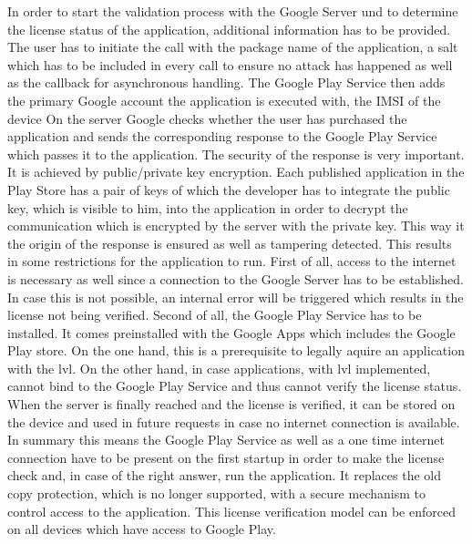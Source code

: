 In order to start the validation process with the Google Server und to determine the license status of the application, additional information has to be provided.
The user has to initiate the call with  the package name of the application, a salt which has to be included in every call to ensure no attack has happened as well as the callback for asynchronous handling.
The Google Play Service then adds the primary Google account the application is executed with, the IMSI of the device
On the server Google checks whether the user has purchased the application and sends the corresponding response to the Google Play Service which passes it to the application. \cite{developersLicensingOverview}
\newline
The security of the response is very important.
It is achieved by public/private key encryption.
Each published application in the Play Store has a pair of keys of which the developer has to integrate the public key, which is visible to him, into the application in order to decrypt the communication which is encrypted by the server with the private key.
This way it the origin of the response is ensured as well as tampering detected.
\cite{munteanLicense}\cite{developersLicensingOverview}
\newline
This results in some restrictions for the application to run.
First of all, access to the internet is necessary as well since a connection to the Google Server has to be established.
In case this is not possible, an internal error will be triggered which results in the license not being verified.
Second of all, the Google Play Service has to be installed.
It comes preinstalled with the Google Apps which includes the Google Play store.
On the one hand, this is a prerequisite to legally aquire an application with the \gls{lvl}.
On the other hand, in case applications, with \gls{lvl} implemented, cannot bind to the Google Play Service and thus cannot verify the license status.
When the server is finally reached and the license is verified, it can be stored on the device and used in future requests in case no internet connection is available.\cite{developersLicensingAdding }\cite{developersLicensingOverview}
\newline
In summary this means the Google Play Service as well as a one time internet connection have to be present on the first startup in order to make the license check and, in case of the right answer, run the application.
It replaces the old copy protection, which is no longer supported, with a secure mechanism to control access to the application.
This license verification model can be enforced on all devices which have access to Google Play. \cite{developersLicensingAdding} \cite{developersLicensingOverview}
